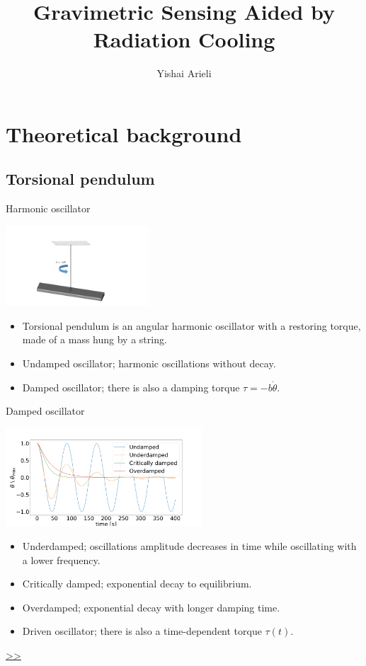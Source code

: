 \documentclass{beamer}
\title[Gravimetric Sensing Aided by Radiation Cooling]{Gravimetric Sensing Aided by Radiation Cooling}
\author[Yishai Arieli]{Yishai Arieli}
\begin{document}
	\typesetFrontSlides

\section{Theoretical background}
\subsection{Torsional pendulum}
\begin{frame}{Harmonic oscillator}
	\begin{center}		
		\includegraphics[width=0.4\textwidth,keepaspectratio]{torsion_pendulum_powerpoint.jpg}
    \end{center}
	\begin{itemize}

		\item Torsional pendulum is an angular harmonic oscillator with a restoring torque, made of a mass hung by a string. 
		\pause
		\item Undamped oscillator; harmonic oscillations without decay.
		\item Damped oscillator; there is also a damping torque $\tau = -b\dot{\theta}$.
		
	\end{itemize}
\end{frame}
\begin{frame}{Damped oscillator}
	\begin{center}		
		\includegraphics[width=0.55\textwidth,keepaspectratio]{damp.png}
    \end{center}
	\begin{itemize}
		
		\item Underdamped; oscillations amplitude decreases in time while oscillating with a lower frequency.
		\item Critically damped; exponential decay to equilibrium.
		\item Overdamped; exponential decay with longer damping time. 
		\pause
		\item Driven oscillator; there is also a time-dependent torque $\tau(t)$.
	\end{itemize}
	\hyperlink{frame:Gravitational field}{>>} 
\end{frame}
\end{document}
